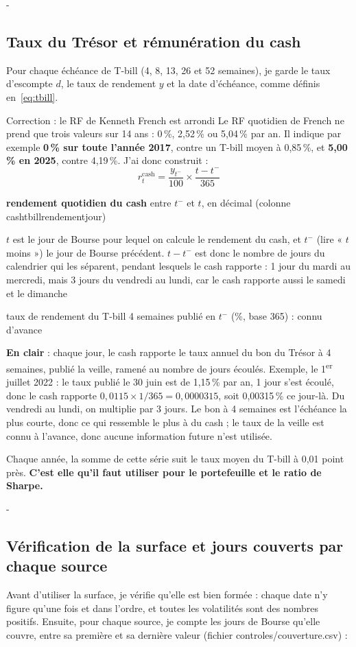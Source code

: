 \documentclass[10pt,a4paper]{article}
\makeatletter
\newcommand{\besoin}[1]{\par\penalty-100\begingroup\setlength{\dimen@}{#1}%
  \dimen@ii\pagegoal\advance\dimen@ii-\pagetotal
  \ifdim\dimen@>\dimen@ii\ifdim\dimen@ii>\z@\vfil\fi\break\fi\endgroup}
\let\soussectionorigine\subsection
\renewcommand{\subsection}{\besoin{5\baselineskip}\soussectionorigine}
\newcommand{\coupure}{\textunderscore\allowbreak}
\newcommand{\fic}[1]{{\small\ttfamily\let\_\coupure #1}}
\newcommand{\notation}[2]{\makebox[2.3cm][l]{#1}\parbox[t]{\dimexpr\linewidth-2.3cm\relax}{#2}\par}
\makeatother
\begin{document}
\subsection{Taux du Trésor et rémunération du cash}\label{sec:cash}
Pour chaque échéance de T-bill (4, 8, 13, 26 et 52 semaines), je garde le taux d'escompte $d$, le taux de rendement $y$ et la date d'échéance, comme définis en~\eqref{eq:tbill}.

\begin{correction}{Correction : le RF de Kenneth French est arrondi}
Le RF quotidien de French ne prend que trois valeurs sur 14 ans : 0\,\%, 2,52\,\% ou 5,04\,\% par an. Il indique par exemple \textbf{0\,\% sur toute l'année 2017}, contre un T-bill moyen à 0,85\,\%, et \textbf{5,00\,\% en 2025}, contre 4,19\,\%. J'ai donc construit :
\begin{equation}\label{eq:cash}
r^{\mathrm{cash}}_t=\frac{y_{t^-}}{100}\times\frac{t-t^-}{365}
\end{equation}
\notation{$r^{\mathrm{cash}}_t$}{\textbf{rendement quotidien du cash} entre $t^-$ et $t$, en décimal (colonne \fic{cash\_tbill\_rendement\_jour})}
\notation{$t,\ t^-,\ t-t^-$}{$t$ est le jour de Bourse pour lequel on calcule le rendement du cash, et $t^-$ (lire « $t$ moins ») le jour de Bourse précédent. $t-t^-$ est donc le nombre de jours du calendrier qui les séparent, pendant lesquels le cash rapporte : 1 jour du mardi au mercredi, mais 3 jours du vendredi au lundi, car le cash rapporte aussi le samedi et le dimanche}
\notation{$y_{t^-}$}{taux de rendement du T-bill 4 semaines publié en $t^-$ (\%, base 365) : connu d'avance}
\textbf{En clair} : chaque jour, le cash rapporte le taux annuel du bon du Trésor à 4 semaines, publié la veille, ramené au nombre de jours écoulés. Exemple, le 1\textsuperscript{er} juillet 2022 : le taux publié le 30 juin est de 1,15\,\% par an, 1 jour s'est écoulé, donc le cash rapporte $0{,}0115\times1/365=0{,}0000315$, soit 0,00315\,\% ce jour-là. Du vendredi au lundi, on multiplie par 3 jours. Le bon à 4 semaines est l'échéance la plus courte, donc ce qui ressemble le plus à du cash ; le taux de la veille est connu à l'avance, donc aucune information future n'est utilisée.

Chaque année, la somme de cette série suit le taux moyen du T-bill à 0,01 point près. \textbf{C'est elle qu'il faut utiliser pour le portefeuille et le ratio de Sharpe.}
\end{correction}

\subsection{Vérification de la surface et jours couverts par chaque source}
Avant d'utiliser la surface, je vérifie qu'elle est bien formée : chaque date n'y figure qu'une fois et dans l'ordre, et toutes les volatilités sont des nombres positifs. Ensuite, pour chaque source, je compte les jours de Bourse qu'elle couvre, entre sa première et sa dernière valeur (fichier \fic{controles/couverture.csv}) :
\end{document}
